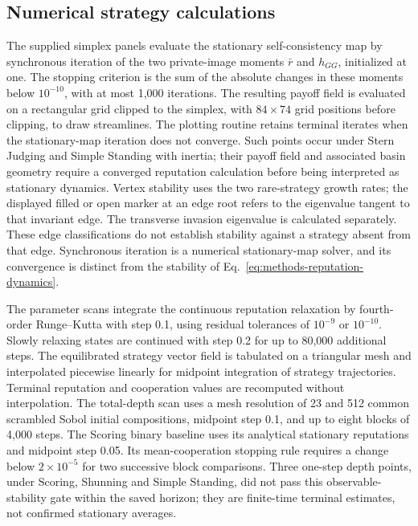 \documentclass[fleqn,10pt]{article}
\begin{document}
\subsection*{Numerical strategy calculations}

The supplied simplex panels evaluate the stationary self-consistency map by synchronous iteration of the two private-image moments $\bar r$ and $h_{GG}$, initialized at one. The stopping criterion is the sum of the absolute changes in these moments below $10^{-10}$, with at most 1,000 iterations. The resulting payoff field is evaluated on a rectangular grid clipped to the simplex, with $84\times74$ grid positions before clipping, to draw streamlines. The plotting routine retains terminal iterates when the stationary-map iteration does not converge. Such points occur under Stern Judging and Simple Standing with inertia; their payoff field and associated basin geometry require a converged reputation calculation before being interpreted as stationary dynamics. Vertex stability uses the two rare-strategy growth rates; the displayed filled or open marker at an edge root refers to the eigenvalue tangent to that invariant edge. The transverse invasion eigenvalue is calculated separately. These edge classifications do not establish stability against a strategy absent from that edge. Synchronous iteration is a numerical stationary-map solver, and its convergence is distinct from the stability of Eq.~\eqref{eq:methods-reputation-dynamics}.

The parameter scans integrate the continuous reputation relaxation by fourth-order Runge--Kutta with step 0.1, using residual tolerances of $10^{-9}$ or $10^{-10}$. Slowly relaxing states are continued with step 0.2 for up to 80,000 additional steps. The equilibrated strategy vector field is tabulated on a triangular mesh and interpolated piecewise linearly for midpoint integration of strategy trajectories. Terminal reputation and cooperation values are recomputed without interpolation. The total-depth scan uses a mesh resolution of 23 and 512 common scrambled Sobol initial compositions, midpoint step 0.1, and up to eight blocks of 4,000 steps. The Scoring binary baseline uses its analytical stationary reputations and midpoint step 0.05. Its mean-cooperation stopping rule requires a change below $2\times10^{-5}$ for two successive block comparisons. Three one-step depth points, under Scoring, Shunning and Simple Standing, did not pass this observable-stability gate within the saved horizon; they are finite-time terminal estimates, not confirmed stationary averages.
\end{document}
